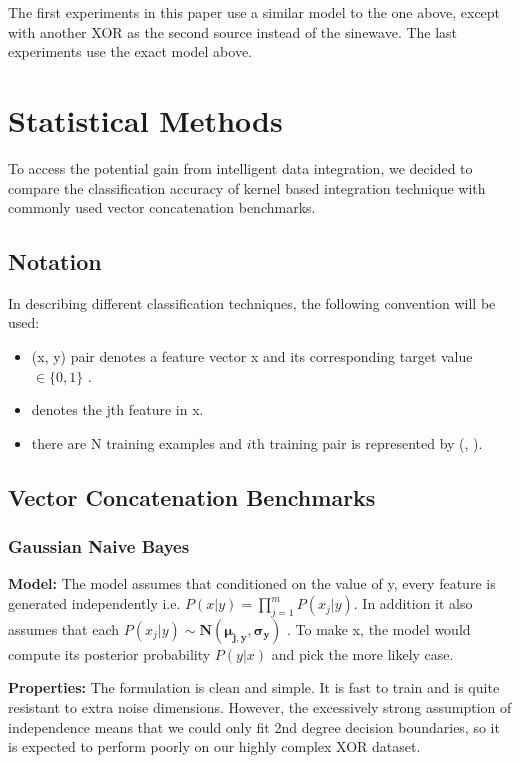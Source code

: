 \documentclass{article}
\begin{document}
The first experiments in this paper use a similar model to the one above, except with another XOR as the second source instead of the sinewave. The last experiments use the exact model above.











\section*{Statistical Methods}

To access the potential gain from intelligent data integration, we decided to compare the classification accuracy of kernel based integration technique with commonly used vector concatenation benchmarks.

\subsection*{Notation}
In describing different classification techniques, the following convention will be used:
\begin{itemize}
\setlength\itemsep{0em}
\item (x, y) pair denotes a feature vector x \mmin {} and its corresponding target value $\in \{0, 1\}$ .
\item {} denotes the jth feature in x.
\item there are N training examples and $i$th training pair is represented by (,  ).
\end{itemize}


\subsection*{Vector Concatenation Benchmarks}

\subsubsection*{Gaussian Naive Bayes}
\textbf{Model:}
The model assumes that conditioned on the value of y, every feature  is generated independently i.e. $P(x|y) = \prod_{j=1}^{m} P(x_j|y)$. In addition it also assumes that each $P(x_j|y) \sim \mathbf{N(\mu_{j,y}, \sigma_y)}$ . To make x, the model would compute its posterior probability $P(y|x)$ and pick the more likely case.

\textbf{Properties:}
The formulation is clean and simple. It is fast to train and is quite resistant to extra noise dimensions.
However, the excessively strong assumption of independence means that we could only fit 2nd degree decision boundaries, so it is expected to perform poorly on our highly complex XOR dataset.
\end{document}
